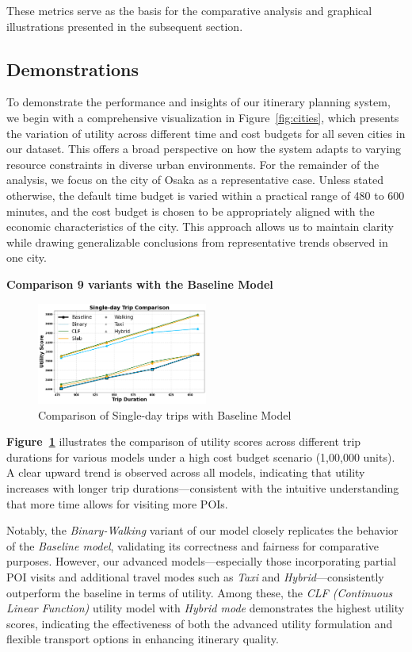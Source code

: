 
These metrics serve as the basis for the comparative analysis and graphical illustrations presented in the subsequent section.

\subsection{Demonstrations}

To demonstrate the performance and insights of our itinerary planning system, we begin with a comprehensive visualization in Figure~\ref{fig:cities}, which presents the variation of utility across different time and cost budgets for all seven cities in our dataset. This offers a broad perspective on how the system adapts to varying resource constraints in diverse urban environments. For the remainder of the analysis, we focus on the city of Osaka as a representative case. Unless stated otherwise, the default time budget is varied within a practical range of 480 to 600 minutes, and the cost budget is chosen to be appropriately aligned with the economic characteristics of the city. This approach allows us to maintain clarity while drawing generalizable conclusions from representative trends observed in one city.

\newpage
\noindent \textbf{Comparison 9 variants with the Baseline Model}
\begin{figure}[H]
\centering
\includegraphics[width=0.5\textwidth]{plots/singledaycomparison.png}
\caption{Comparison of Single-day trips with Baseline Model}
\label{fig:comparisonWithBaselinePlot_singleday}
\end{figure}
\noindent
\textbf{Figure~\ref{fig:comparisonWithBaselinePlot_singleday}} illustrates the comparison of utility scores across different trip durations for various models under a high cost budget scenario (1,00,000 units). A clear upward trend is observed across all models, indicating that utility increases with longer trip durations—consistent with the intuitive understanding that more time allows for visiting more POIs.

Notably, the \textit{Binary-Walking} variant of our model closely replicates the behavior of the \textit{Baseline model}, validating its correctness and fairness for comparative purposes. However, our advanced models—especially those incorporating partial POI visits and additional travel modes such as \textit{Taxi} and \textit{Hybrid}—consistently outperform the baseline in terms of utility. Among these, the \textit{CLF (Continuous Linear Function)} utility model with \textit{Hybrid mode} demonstrates the highest utility scores, indicating the effectiveness of both the advanced utility formulation and flexible transport options in enhancing itinerary quality.

